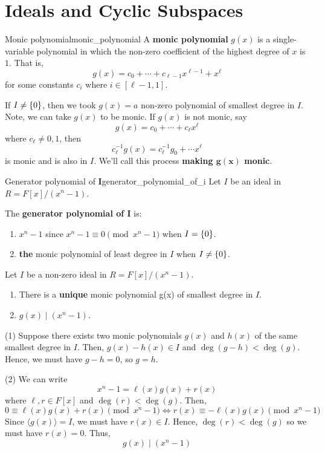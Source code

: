 \section{Ideals and Cyclic Subspaces}

\begin{Definition}{Monic polynomial}{monic_polynomial}
    A \textbf{monic polynomial} $ g(x) $ is a single-variable
    polynomial in which the non-zero coefficient of the highest degree of $ x $
    is $ 1 $. That is,
    \[ g(x)=c_0+\cdots+c_{\ell -1}x^{\ell -1}+ x^\ell \]
    for some constants $ c_i $ where $ i\in[\ell-1,1] $.
\end{Definition}

If $ I\neq \{0\} $, then we took $ g(x)=a $ non-zero
polynomial of smallest degree in $ I $. Note, we can
take $ g(x) $ to be monic. If $ g(x) $ is not monic, say
\[ g(x)=c_0+\cdots+c_\ell x^{\ell} \]
where $ c_\ell \neq 0, 1 $, then
\[ c_{\ell}^{-1}g(x)=c_\ell^{-1} g_0+\cdots x^\ell \]
is monic and is also in $ I $. We'll call this process
\textbf{making $ \symbf{g(x)} $ monic}.

\begin{Definition}{Generator polynomial of $ \symbf{I} $}{generator_polynomial_of_i}
    Let $ I $ be an ideal in $ R=F[x]/(x^n-1) $.

    The \textbf{generator polynomial of $ \symbf{I} $} is:
    \begin{enumerate}[label=(\arabic*)]
        \item $ x^n-1 $ since $ x^n-1\equiv 0 \pmod{x^n-1} $ when $ I=\{0\} $.
        \item \textbf{the}
              monic polynomial of least degree in $ I $ when $ I \neq \{0\} $.
    \end{enumerate}
\end{Definition}

\begin{Theorem}{}{}
    Let $ I $ be a non-zero ideal in $ R=F[x]/(x^n-1) $.
    \begin{enumerate}[label=(\arabic*)]
        \item There is a \textbf{unique} monic polynomial
              g(x) of smallest degree in $ I $.
        \item $ g(x)\mid (x^n-1) $.
    \end{enumerate}
\end{Theorem}

\begin{Proof}{}{}
    (1) Suppose
    there exists two monic polynomials $ g(x) $ and $ h(x) $
    of the same smallest degree in $ I $.
    Then, $ g(x)-h(x)\in I $ and $ \deg(g-h)<\deg (g) $. Hence, we must
    have $ g-h=0 $, so $ g=h $.

    (2) We can write
    \[ x^n-1=\ell(x)g(x)+r(x) \]
    where $ \ell,r\in F[x] $ and $ \deg(r)<\deg(g) $. Then,
    \[ 0\equiv \ell (x)g(x)+r(x)\pmod{x^n-1}\iff r(x)\equiv -\ell(x)g(x)\pmod{x^n-1} \]
    Since $ \langle g(x)\rangle = I $, we must have $ r(x)\in I $.
    Hence, $ \deg(r)<\deg(g) $ so we must have $ r(x)=0 $. Thus,
    \[ g(x)\mid (x^n-1) \]
\end{Proof}

